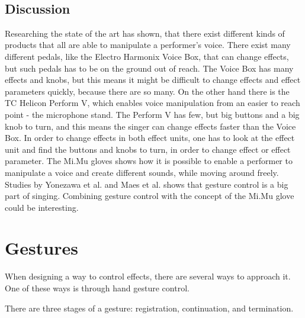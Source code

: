 \begin{minipage}{\linewidth}%
\label{One_Person_Choir}
\end{minipage}\\

\subsection{Discussion}

Researching the state of the art has shown, that there exist different kinds of products that all are able to manipulate a performer's voice. There exist many different pedals, like the Electro Harmonix Voice Box, that can change effects, but such pedals has to be on the ground out of reach\citep{VoiceBox}. The Voice Box has many effects and knobs, but this means it might be difficult to change  effects and effect parameters quickly, because there are so many. On the other hand there is the TC Helicon Perform V, which enables voice manipulation from an easier to reach point - the microphone stand\citep{TC}. The Perform V has few, but big buttons and a big knob to turn, and this means the singer can change effects faster than the Voice Box. In order to change effects in both effect units, one has to look at the effect unit and find the buttons and knobs to turn, in order to change effect or effect parameter. 
The Mi.Mu gloves shows how it is possible to enable a performer to manipulate a voice and create different sounds, while moving around freely\citep{Mimu}. Studies by Yonezawa et al. and Maes et al. shows that gesture control is a big part of singing\citep{Yonezawa_2005}\citep{Maes_2011}. Combining gesture control with the concept of the Mi.Mu glove could be interesting.


\section{Gestures}

When designing a way to control effects, there are several ways to approach it. One of these ways is through hand gesture control.

There are three stages of a gesture: registration, continuation, and termination\citep[pp. 127-134]{Wigdor_2011}.\\

